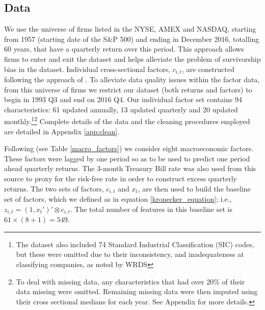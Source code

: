 \documentclass{article}
\begin{document}
\subsection{Data}
We use the universe of firms listed in the NYSE, AMEX and NASDAQ, starting from 1957 (starting date of the S\&P 500) and ending in December 2016, totalling 60 years, that have a quarterly return over this period. This approach allows firms to enter and exit the dataset and helps alleviate the problem of survivorship bias in the dataset. Individual cross-sectional factors, $c_{i,t}$, are constructed following the approach of \cite{gu_empirical_2019}. {To alleviate data quality issues within the factor data, from this universe of firms we restrict our dataset (both returns and factors) to begin in 1993 Q3 and end on 2016 Q4.} Our individual factor set contains 94 characteristics: 61 updated annually, 13 updated quarterly and 20 updated monthly.\footnote{The dataset also included 74 Standard Industrial Classification (SIC) codes, but these were omitted due to their inconsistency, and inadequateness at classifying companies, as noted by WRDS}\footnote{To deal with missing data, any characteristics that had over 20\% of their data missing were omitted. Remaining missing data were then imputed using their cross sectional medians for each year. See Appendix for more details.} Complete details of the data and the cleaning procedures employed are detailed in Appendix \ref{app:clean}.


Following \cite{welch_comprehensive_2008} (see Table \ref{macro_factors}) we consider eight macroeconomic factors. These factors were lagged by one period so as to be used to predict one period ahead quarterly returns. The 3-month Treasury Bill rate was also used from this source to proxy for the risk-free rate in order to construct excess quarterly returns. The two sets of factors, $c_{i, t}$ and $x_t$, are then used to build the baseline set of factors, which we defined as in equation \eqref{kronecker_equation}; i.e., $z_{i, t}= (1, x_t')' \otimes c_{i, t}$. The total number of features in this baseline set is $61 \times (8 + 1) = 549$.
\end{document}
